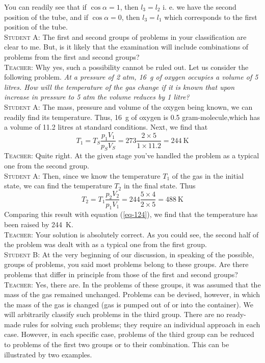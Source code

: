 \documentclass[a4paper,sfsidenotes]{tufte-book}
\begin{document}
You can readily see that if $\cos \alpha =1$, then $l_{3}  = l_{2}$ i. e. we have the second position of the tube, and if $\cos \alpha =0$, then $l_{3}  = l_{1}$ which corresponds to the first position of the tube.
\\
\textsc{Student A:} The first and second groups of problems in your classification are clear to me. But, is it likely that the examination will include combinations of problems from the first and second groups?
\\
\textsc{Teacher:} Why yes, such a possibility cannot be ruled out. Let us consider the following problem. \emph{At a pressure of 2 atm, \SI{16}{\gram} of oxygen occupies a volume of 5 litres. How will the temperature of the gas change if it is known that upon increase in pressure to 5 atm the volume reduces by 1 litre?}
\\
\textsc{Student A:} The mass, pressure and volume of the oxygen being known, we can readily find its temperature. Thus, \SI{16}{\gram} of oxygen is 0.5 gram-molecule,which has a volume of 11.2 litres at standard conditions. Next, we find that
\begin{equation}%
T_{1}=T_{S}\frac{p_{1}V_{1}}{p_{S}V_{S}} =273 \frac{2 \times 5}{ 1 \times 11.2} =\SI{244}{\kelvin}
\label{eq-124}
\end{equation}
\textsc{Teacher:} Quite right. At the given stage you've handled the problem as a typical one from the second group.
\\
\textsc{Student A:} Then, since we know the temperature $T_{1}$ of the gas in the initial state, we can find the temperature $T_{2}$ in the final state. Thus
\begin{equation*}%
T_{2}=T_{1}\frac{p_{2}V_{2}}{p_{1}V_{1}} =244 \frac{5 \times 4}{ 2 \times 5} =\SI{488}{\kelvin}
\end{equation*}
Comparing this result with equation (\ref{eq-124}), we find that the temperature has been raised by \SI{244}{\kelvin}.
\\
\textsc{Teacher:} Your solution is absolutely correct. As you could see, the second half of the problem was dealt with as a typical one from the first group.
\\
\textsc{Student B:} At the very beginning of our discussion, in speaking of the possible, groups of problems, you said most problems belong to these groups. Are there problems that differ in principle from those of the first and second groups?
\\
\textsc{Teacher:} Yes, there are. In the problems of these groups, it was assumed that the mass of the gas remained unchanged. Problems can be devised, however, in which the mass of the gas is changed (gas is pumped out of or into the container). We will arbitrarily classify such problems in the third group. There are no ready-made rules for solving such problems; they require an individual approach in each case. However, in each specific case, problems of the third group can be reduced to problems of the first two groups or to their combination. This can be illustrated by two examples. 
\end{document}
